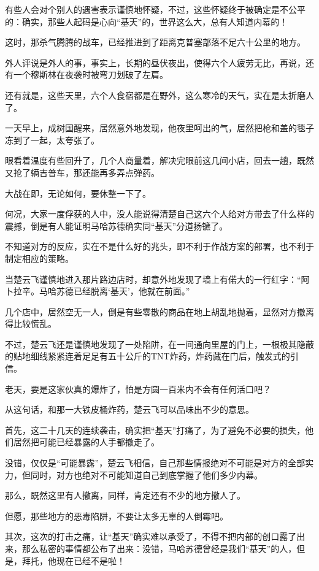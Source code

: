 有些人会对个别人的遇害表示谨慎地怀疑，不过，这些怀疑终于被确定是不公平的：确实，那些人起码是心向“基天”的，世界这么大，总有人知道内幕的！

这时，那杀气腾腾的战车，已经推进到了距离克普塞部落不足六十公里的地方。

外人评说是外人的事，事实上，长期的昼伏夜出，使得六个人疲劳无比，再说，还有一个穆斯林在夜袭时被弯刀划破了左肩。

还有就是，这些天里，六个人食宿都是在野外，这么寒冷的天气，实在是太折磨人了。

一天早上，成树国醒来，居然意外地发现，他夜里呵出的气，居然把枪和盖的毯子冻到了一起，太夸张了。

眼看着温度有些回升了，几个人商量着，解决完眼前这几间小店，回去一趟，既然又抢了辆吉普车，那还能再多弄点弹药。

大战在即，无论如何，要休整一下了。

何况，大家一度俘获的人中，没人能说得清楚自己这六个人给对方带去了什么样的震撼，倒是有人能证明马哈苏德确实同“基天”分道扬镳了。

不知道对方的反应，实在不是什么好的兆头，即不利于作战方案的部署，也不利于制定相应的策略。

当楚云飞谨慎地进入那片路边店时，却意外地发现了墙上有偌大的一行红字：“阿卜拉辛。马哈苏德已经脱离‘基天’，他就在前面。”

几个店中，居然空无一人，倒是有些零散的商品在地上胡乱地抛着，显然对方撤离得比较慌乱。

不过，楚云飞还是谨慎地发现了一处陷阱，在一间通向里屋的门上，一根极其隐蔽的贴地细线紧紧连着足足有五十公斤的TNT炸药，炸药藏在门后，触发式的引信。

老天，要是这家伙真的爆炸了，怕是方圆一百米内不会有任何活口吧？

从这句话，和那一大铁皮桶炸药，楚云飞可以品味出不少的意思。

首先，这二十几天的连续袭击，确实把“基天”打痛了，为了避免不必要的损失，他们居然把可能已经暴露的人手都撤走了。

没错，仅仅是“可能暴露”，楚云飞相信，自己那些情报绝对不可能是对方的全部实力，但同时，对方也绝对不可能知道自己到底掌握了他们多少内幕。

那么，既然这里有人撤离，同样，肯定还有不少的地方撤人了。

但愿，那些地方的恶毒陷阱，不要让太多无辜的人倒霉吧。

其次，这次的打击之痛，让“基天”确实难以承受了，不得不把内部的创口露了出来，那么私密的事情都公布了出来：没错，马哈苏德曾经是我们“基天”的人，但是，拜托，他现在已经不是啦！

